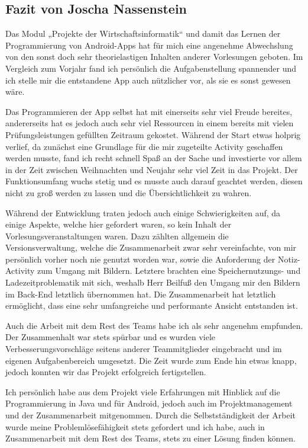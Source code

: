 \subsection{Fazit von Joscha Nassenstein}

Das Modul „Projekte der Wirtschaftsinformatik“ und damit das Lernen der Programmierung von Android-Apps hat für mich eine angenehme Abwechslung von den sonst doch sehr theorielastigen Inhalten anderer Vorlesungen geboten. Im Vergleich zum Vorjahr fand ich persönlich die Aufgabenstellung spannender und ich stelle mir die entstandene App auch nützlicher vor, als sie es sonst gewesen wäre.

Das Programmieren der App selbst hat mit einerseits sehr viel Freude bereites, andererseits hat es jedoch auch sehr viel Ressourcen in einem bereits mit vielen Prüfungsleistungen gefüllten Zeitraum gekostet. Während der Start etwas holprig verlief, da zunächst eine Grundlage für die mir zugeteilte Activity geschaffen werden musste, fand ich recht schnell Spaß an der Sache und investierte vor allem in der Zeit zwischen Weihnachten und Neujahr sehr viel Zeit in das Projekt. Der Funktionsumfang wuchs stetig und es musste auch darauf geachtet werden, diesen nicht zu groß werden zu lassen und die Übersichtlichkeit zu wahren.

Während der Entwicklung traten jedoch auch einige Schwierigkeiten auf, da einige Aspekte, welche hier gefordert waren, so kein Inhalt der Vorlesungsveranstaltungen waren. Dazu zählten allgemein die Versionsverwaltung, welche die Zusammenarbeit zwar sehr vereinfachte, von mir persönlich vorher noch nie genutzt worden war, sowie die Anforderung der Notiz-Activity zum Umgang mit Bildern. Letztere brachten eine Speichernutzungs- und Ladezeitproblematik mit sich, weshalb Herr Beilfuß den Umgang mir den Bildern im Back-End letztlich übernommen hat. Die Zusammenarbeit hat letztlich ermöglicht, dass eine sehr umfangreiche und performante Ansicht entstanden ist.

Auch die Arbeit mit dem Rest des Teams habe ich als sehr angenehm empfunden. Der Zusammenhalt war stets spürbar und es wurden viele Verbesserungsvorschläge seitens anderer Teammitglieder eingebracht und im eigenen Aufgabenbereich umgesetzt. Die Zeit wurde zum Ende hin etwas knapp, jedoch konnten wir das Projekt erfolgreich fertigstellen.

Ich persönlich habe aus dem Projekt viele Erfahrungen mit Hinblick auf die Programmierung in Java und für Android, jedoch auch im Projektmanagement und der Zusammenarbeit mitgenommen. Durch die Selbstständigkeit der Arbeit wurde meine Problemlösefähigkeit stets gefordert und ich habe, auch in Zusammenarbeit mit dem Rest des Teams, stets zu einer Lösung finden können.


